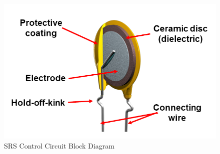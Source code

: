 \begin{figure}
\includegraphics[keepaspectratio=true,scale=.5]{./figures/testImage.png}
\centering
\caption{SRS Control Circuit Block Diagram}
\label{srsCtrlBlock}
\end{figure}
